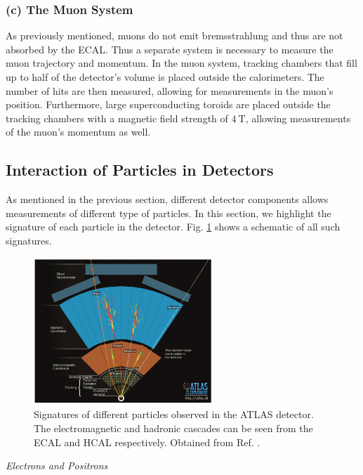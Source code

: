 \documentclass[a4paper]{report}
\numberwithin{equation}{section}
\begin{document}
\subsubsection{(c) The Muon System}

As previously mentioned, muons do not emit bremsstrahlung and thus are not absorbed by the ECAL. Thus a separate system is necessary to measure the muon trajectory 
and momentum. In the muon system, tracking chambers that fill up to half of the detector's volume is placed outside the calorimeters. The number of hits are then 
measured, allowing for measurements in the muon's position. Furthermore, large superconducting toroids are placed outside the tracking chambers with a magnetic 
field strength of $\SI{4}{\tesla}$, allowing measurements of the muon's momentum as well. \\

\subsection{Interaction of Particles in Detectors}

As mentioned in the previous section, different detector components allows measurements of different type of particles. In this 
section, we highlight the signature of each particle in the detector. Fig. \ref{fig:detector_signatures} shows a schematic of all such signatures. 

\begin{figure}[htpb]
    \centering
    \includegraphics[width=0.6\textwidth]{detector_signatures.png}
    \caption{Signatures of different particles observed in the ATLAS detector. The electromagnetic and hadronic cascades can be seen from the ECAL and HCAL 
	respectively. Obtained from Ref. \cite{Gerber2019}. }
    \label{fig:detector_signatures}
\end{figure}

\noindent \textit{Electrons and Positrons} \\ 
\end{document}
